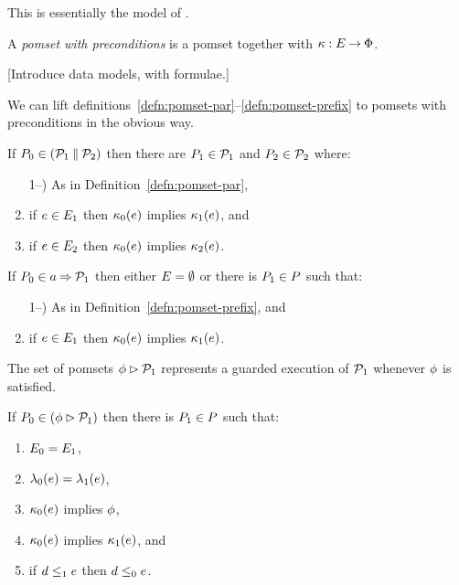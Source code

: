This is essentially the model of \cite{10.1145/3428262}.

\begin{definition}
  A \emph{pomset with preconditions} is
  a pomset together with $\kappa:E\mathbin\rightarrow\Phi$.
\end{definition}

[Introduce data models, with formulae.]

We can lift definitions~\ref{defn:pomset-par}--\ref{defn:pomset-prefix} to pomsets with preconditions in
the obvious way.

\begin{definition}
  \label{defn:pomset-pre-par}
  If $P_0 \in (\mathcal{P}_1\mathbin{\parallel}\mathcal{P}_2)$ then
  there are $P_1\in\mathcal{P}_1$ and $P_2\in\mathcal{P}_2$ where:
  \begin{enumerate}
    \setcounter{enumi}{\value{pomsetParCount}}
  \item[1--\thepomsetParCount)] As in Definition~\ref{defn:pomset-par},
  \item if $e\in E_1$ then $\kappa_0(e)$ implies $\kappa_1(e)$, and
  \item if $e\in E_2$ then $\kappa_0(e)$ implies $\kappa_2(e)$.
  \end{enumerate}
\end{definition}

\begin{definition}
  \label{defn:pomset-pre-prefix}
  If $P_0 \in a\mathbin{\Rightarrow}\mathcal{P}_1$ then
  either $E=\emptyset$ or there is $P_1\in P$ such that:
  \begin{enumerate}
    \setcounter{enumi}{\value{pomsetPrefixCount}}
  \item[1--\thepomsetPrefixCount)] As in Definition~\ref{defn:pomset-prefix}, and
  \item if $e\in E_1$ then $\kappa_0(e)$ implies $\kappa_1(e)$.
  \end{enumerate}
\end{definition}

The set of pomsets $\phi\mathbin\rhd\mathcal{P}_1$ represents a guarded execution of $\mathcal{P}_1$ whenever $\phi$ is satisfied.
\begin{definition}
  \label{defn:pomset-guard}
  If $P_0 \in (\phi\mathbin\rhd\mathcal{P}_1)$ then there is $P_1\in P$ such that:
  \begin{enumerate}
  \item $E_0 = E_1$,
  \item $\lambda_0(e) = \lambda_1(e)$,
  \item $\kappa_0(e)$ implies $\phi$,
  \item $\kappa_0(e)$ implies $\kappa_1(e)$, and
  \item if $d\le_1e$ then $d\le_0e$.
    \setcounter{pomsetGuardCount}{\value{enumi}}
  \end{enumerate}
\end{definition}

